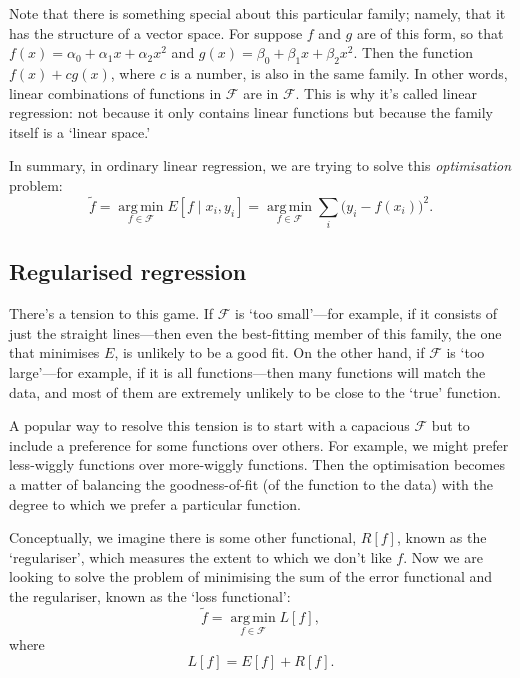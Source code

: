 \documentclass[11pt]{article}
\begin{document}
Note that there is something special about this particular family; namely, that
it has the structure of a vector space. For suppose \(f\) and \(g\) are of this
form, so that \(f(x) = \alpha_0 + \alpha_1 x + \alpha_2 x^2\) and \(g(x) =
\beta_0 + \beta_1 x + \beta_2 x^2\). Then the function \(f(x) + c g(x)\), where \(c\)
is a number, is also in the same family. In other words, linear combinations of
functions in \(\mathcal{F}\) are in \(\mathcal{F}\). This is why it's called linear
regression: not because it only contains linear functions but because the family
itself is a `linear space.'

In summary, in ordinary linear regression, we are trying to solve this
\emph{optimisation} problem:
\begin{equation}
\tilde{f} = 
\operatorname*{arg\,min}_{f\in\mathcal{F}} E[f\mid x_i, y_i] =
\operatorname*{arg\,min}_{f\in\mathcal{F}} \sum_i \bigl(y_i - f(x_i)\bigr)^2.
\end{equation}


\subsection{Regularised regression}
\label{sec:orgb110553}

There's a tension to this game. If \(\mathcal{F}\) is `too small'---for example,
if it consists of just the straight lines---then even the best-fitting member of
this family, the one that minimises \(E\), is unlikely to be a good fit. On the
other hand, if \(\mathcal{F}\) is `too large'---for example, if it is all
functions---then many functions will match the data, and most of them are
extremely unlikely to be close to the `true' function.

A popular way to resolve this tension is to start with a capacious \(\mathcal{F}\)
but to include a preference for some functions over others. For example, we
might prefer less-wiggly functions over more-wiggly functions. Then the
optimisation becomes a matter of balancing the goodness-of-fit (of the function
to the data) with the degree to which we prefer a particular function.

Conceptually, we imagine there is some other functional, \(R[f]\), known as the
`regulariser', which measures the extent to which we don't like \(f\). Now we are
looking to solve the problem of minimising the sum of the error functional and
the regulariser, known as the `loss functional':
\begin{equation}
\tilde{f} = \operatorname*{arg\,min}_{f\in\mathcal{F}} L[f],
\end{equation}
where
\begin{equation} 
L[f] = E[f] + R[f].
\end{equation}
\end{document}
